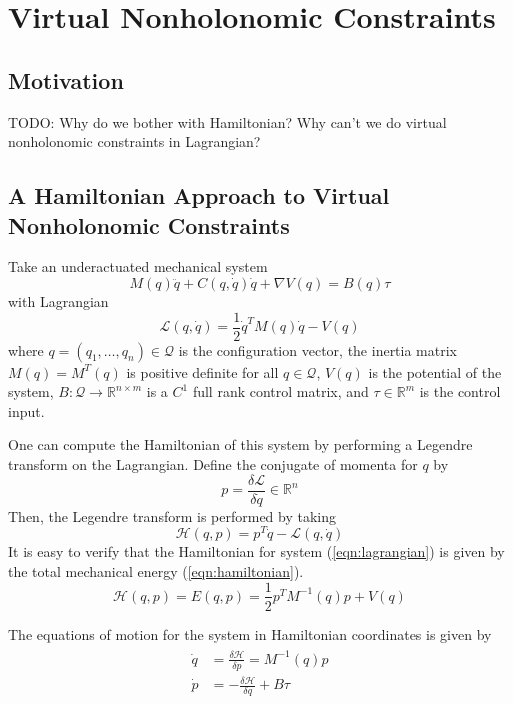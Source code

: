\section{Virtual Nonholonomic Constraints}

\subsection{Motivation}
TODO: Why do we bother with Hamiltonian? Why can't we do virtual nonholonomic constraints in Lagrangian?

\subsection{A Hamiltonian Approach to Virtual Nonholonomic Constraints}
Take an underactuated mechanical system 
\begin{equation}\label{eqn:eom_lagrangian}
M(q)\ddot{q} + C(q,\dot{q})\dot{q} + \nabla V(q) = B(q)\tau
\end{equation}
with Lagrangian
\begin{equation}\label{eqn:lagrangian}
\mathcal{L}(q,\dot{q}) = \frac{1}{2} \dot{q}^T M(q) \dot{q} - V(q)
\end{equation}
where \(q = (q_1,\ldots,q_n) \in \mathcal{Q}\) is the configuration vector, the inertia matrix \(M(q) = M^T(q)\) is positive definite for all \(q \in \mathcal{Q}\), \(V(q)\) is the potential of the system, \(B : \mathcal{Q} \rightarrow \mathbb{R}^{n \times m}\) is a \(C^1\) full rank control matrix, and \(\tau \in \mathbb{R}^{m}\) is the control input.

One can compute the Hamiltonian of this system by performing a Legendre transform on the Lagrangian. Define the conjugate of momenta for \(q\) by 
\[
p = \frac{\delta \mathcal{L}}{\delta \dot{q}} \in \mathbb{R}^n
\]
Then, the Legendre transform is performed by taking
\[
\mathcal{H}(q,p) = p^T \dot{q} - \mathcal{L}(q,\dot{q})
\]
It is easy to verify that the Hamiltonian for system (\ref{eqn:lagrangian}) is given by the total mechanical energy (\ref{eqn:hamiltonian}).
\begin{equation}\label{eqn:hamiltonian}
\mathcal{H}(q,p) = E(q,p) = \frac{1}{2} p^T M^{-1}(q) p + V(q)
\end{equation}

The equations of motion for the system in Hamiltonian coordinates is given by
\begin{align}\label{eqn:hamiltionian_eom}
\begin{split}
\dot{q} &= \frac{\delta \mathcal{H}}{\delta p} = M^{-1}(q) p \\
\dot{p} &= -\frac{\delta \mathcal{H}}{\delta q} + B \tau
\end{split}
\end{align}

